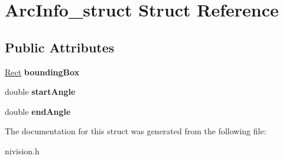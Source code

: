 \hypertarget{structArcInfo__struct}{
\section{ArcInfo\_\-struct Struct Reference}
\label{structArcInfo__struct}
}
\subsection*{Public Attributes}
\begin{DoxyCompactItemize}
\item 
\hypertarget{structArcInfo__struct_ad531b25d6055799f5050a0be997ed71f}{
\hyperlink{structRect__struct}{Rect} {\bfseries boundingBox}}
\label{structArcInfo__struct_ad531b25d6055799f5050a0be997ed71f}

\item 
\hypertarget{structArcInfo__struct_af2b2b21bc1598ece4c4ddbc1f843cdd7}{
double {\bfseries startAngle}}
\label{structArcInfo__struct_af2b2b21bc1598ece4c4ddbc1f843cdd7}

\item 
\hypertarget{structArcInfo__struct_a84b4a78d4f3b15196fb7d47ce7f60d47}{
double {\bfseries endAngle}}
\label{structArcInfo__struct_a84b4a78d4f3b15196fb7d47ce7f60d47}

\end{DoxyCompactItemize}


The documentation for this struct was generated from the following file:\begin{DoxyCompactItemize}
\item 
nivision.h\end{DoxyCompactItemize}
